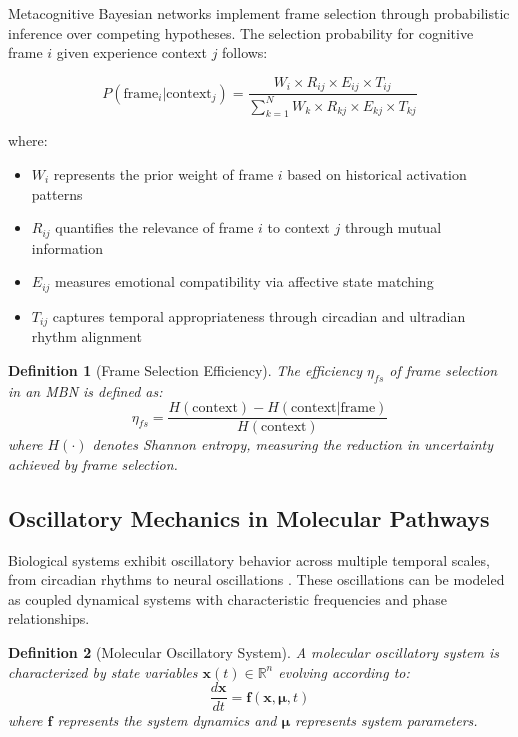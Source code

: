 \documentclass[12pt,a4paper]{article}
\newtheorem{definition}{Definition}[section]
\begin{document}
Metacognitive Bayesian networks implement frame selection through probabilistic inference over competing hypotheses. The selection probability for cognitive frame $i$ given experience context $j$ follows:

\begin{equation}
P(\text{frame}_i | \text{context}_j) = \frac{W_i \times R_{ij} \times E_{ij} \times T_{ij}}{\sum_{k=1}^{N} W_k \times R_{kj} \times E_{kj} \times T_{kj}}
\end{equation}

where:
\begin{itemize}
\item $W_i$ represents the prior weight of frame $i$ based on historical activation patterns
\item $R_{ij}$ quantifies the relevance of frame $i$ to context $j$ through mutual information
\item $E_{ij}$ measures emotional compatibility via affective state matching
\item $T_{ij}$ captures temporal appropriateness through circadian and ultradian rhythm alignment
\end{itemize}

\begin{definition}[Frame Selection Efficiency]
The efficiency $\eta_{fs}$ of frame selection in an MBN is defined as:
\begin{equation}
\eta_{fs} = \frac{H(\text{context}) - H(\text{context} | \text{frame})}{H(\text{context})}
\end{equation}
where $H(\cdot)$ denotes Shannon entropy, measuring the reduction in uncertainty achieved by frame selection.
\end{definition}

\subsection{Oscillatory Mechanics in Molecular Pathways}

Biological systems exhibit oscillatory behavior across multiple temporal scales, from circadian rhythms to neural oscillations \citep{goldbeter1996biochemical, buzsaki2006rhythms}. These oscillations can be modeled as coupled dynamical systems with characteristic frequencies and phase relationships.

\begin{definition}[Molecular Oscillatory System]
A molecular oscillatory system is characterized by state variables $\mathbf{x}(t) \in \mathbb{R}^n$ evolving according to:
\begin{equation}
\frac{d\mathbf{x}}{dt} = \mathbf{f}(\mathbf{x}, \boldsymbol{\mu}, t)
\end{equation}
where $\mathbf{f}$ represents the system dynamics and $\boldsymbol{\mu}$ represents system parameters.
\end{definition}
\end{document}
